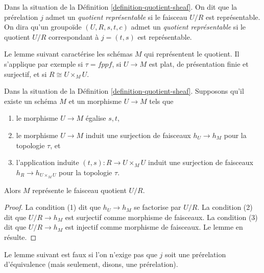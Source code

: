 \begin{definition}
\label{definition-representable-quotient}
Dans la situation de la Définition \ref{definition-quotient-sheaf}.
On dit que la prérelation $j$ admet un
{\it quotient représentable} si le faisceau $U/R$ est représentable.
On dira qu'un groupoïde $(U, R, s, t, c)$ admet un
{\it quotient représentable}
si le quotient $U/R$ correspondant à $j = (t, s)$ est représentable.
\end{definition}

\noindent
Le lemme suivant caractérise les schémas $M$ qui représentent le quotient.
Il s'applique par exemple si $\tau = fppf$, si $U \to M$ est plat,
de présentation finie et surjectif, et si $R \cong U \times_M U$.

\begin{lemma}
\label{lemma-criterion-quotient-representable}
Dans la situation de la Définition \ref{definition-quotient-sheaf}.
Supposons qu'il existe un schéma $M$ et un morphisme $U \to M$ tels que
\begin{enumerate}
\item le morphisme $U \to M$ égalise $s, t$,
\item le morphisme $U \to M$ induit une surjection de faisceaux
$h_U \to h_M$ pour la topologie $\tau$, et
\item l'application induite $(t, s) : R \to U \times_M U$ induit une
surjection de faisceaux $h_R \to h_{U \times_M U}$ pour la topologie $\tau$.
\end{enumerate}
Alors $M$ représente le faisceau quotient $U/R$.
\end{lemma}

\begin{proof}
La condition (1) dit que $h_U \to h_M$ se factorise par $U/R$.
La condition (2) dit que $U/R \to h_M$ est surjectif comme morphisme de faisceaux.
La condition (3) dit que $U/R \to h_M$ est injectif comme morphisme de faisceaux.
Le lemme en résulte.
\end{proof}

\noindent
Le lemme suivant est faux si l'on n'exige pas que $j$ soit une
prérelation d'équivalence (mais seulement, disons, une prérelation).

